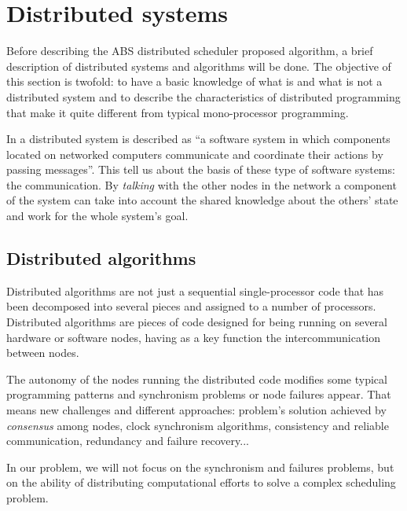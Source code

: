 
\section{Distributed systems}

Before describing the ABS distributed scheduler proposed algorithm, a brief description of distributed systems and algorithms will be done. The objective of this section is twofold: to have a basic knowledge of what is and what is not a distributed system and to describe the characteristics of distributed programming that make it quite different from typical mono-processor programming.

In \citep{Coulouris:2011:DSC:2029110} a distributed system is described as ``a software system in which components located on networked computers communicate and coordinate their actions by passing messages''. This tell us about the basis of these type of software systems: the communication. By \emph{talking} with the other nodes in the network a component of the system can take into account the shared knowledge about the others' state and work for the whole system's goal.

\subsection{Distributed algorithms}
 
Distributed algorithms are not just a sequential single-processor code that has been decomposed into several pieces and assigned to a number of processors. Distributed algorithms are pieces of code designed for being running on several hardware or software nodes, having as a key function the intercommunication between nodes.

The autonomy of the nodes running the distributed code modifies some typical programming patterns and synchronism problems or node failures appear. That means new challenges and different approaches: problem's solution achieved by \emph{consensus} among nodes, clock synchronism algorithms, consistency and reliable communication, redundancy and failure recovery... \citep{Tanenbaum:2006:DSP:1202502}

In our problem, we will not focus on the synchronism and failures problems, but on the ability of distributing computational efforts to solve a complex scheduling problem.

